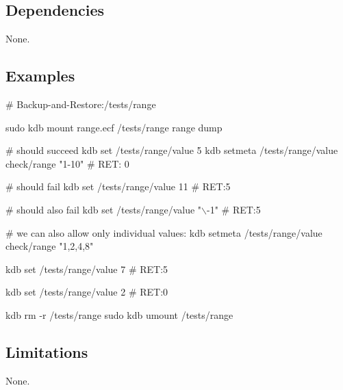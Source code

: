 \subsection*{Dependencies}

None.

\subsection*{Examples}


\begin{DoxyCode}
# Backup-and-Restore:/tests/range

sudo kdb mount range.ecf /tests/range range dump

# should succeed
kdb set /tests/range/value 5
kdb setmeta /tests/range/value check/range "1-10"
# RET: 0

# should fail
kdb set /tests/range/value 11
# RET:5

# should also fail
kdb set /tests/range/value "\(\backslash\)-1"
# RET:5

# we can also allow only individual values:
kdb setmeta /tests/range/value check/range "1,2,4,8"

kdb set /tests/range/value 7
# RET:5

kdb set /tests/range/value 2
# RET:0

kdb rm -r /tests/range
sudo kdb umount /tests/range
\end{DoxyCode}


\subsection*{Limitations}

None. 